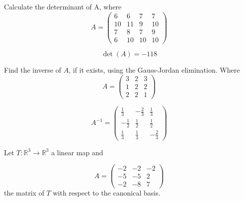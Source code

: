 \begin{questions}

\question Calculate the determinant of A, where
$$
A=\left(\begin{array}{rrrr}
6 & 6 & 7 & 7 \\
10 & 11 & 9 & 10 \\
7 & 8 & 7 & 9 \\
6 & 10 & 10 & 10
\end{array}\right)
$$

\begin{solution}
$$\det(A)=-118$$
\end{solution}

\question Find the inverse of $A$, if it exists, using the Gauss-Jordan elimination. Where
$$
A=\left(\begin{array}{rrr}
3 & 2 & 3 \\
1 & 2 & 2 \\
2 & 2 & 1
\end{array}\right)
$$

\begin{solution}
$$A^{-1}=\left(\begin{array}{rrr}
\frac{1}{3} & -\frac{2}{3} & \frac{1}{3} \\
-\frac{1}{2} & \frac{1}{2} & \frac{1}{2} \\
\frac{1}{3} & \frac{1}{3} & -\frac{2}{3}
\end{array}\right)$$
\end{solution}

\question Let $T:\mathbb{R}^3\rightarrow\mathbb{R}^3$  a linear map and
 
$$
A=\left(\begin{array}{rrr}
-2 & -2 & -2 \\
-5 & -5 & 2 \\
-2 & -8 & 7
\end{array}\right)
$$
the matrix of $T$ with respect to the canonical basis.
\end{questions}
